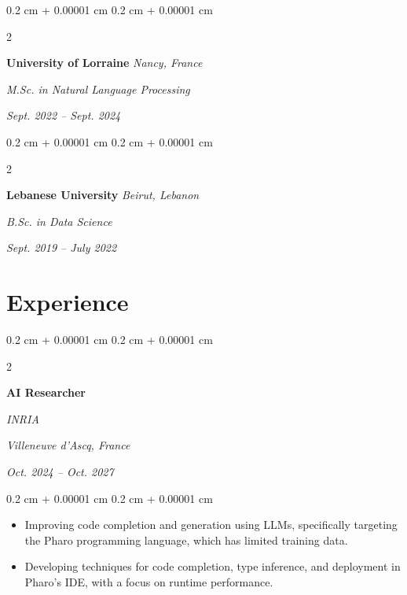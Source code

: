 \documentclass[10pt, letterpaper]{article}
\newenvironment{highlights}{
    \begin{itemize}[
        topsep=0.10 cm,
        parsep=0.10 cm,
        partopsep=0pt,
        itemsep=0pt,
        leftmargin=0.4 cm + 10pt
    ]
}{
    \end{itemize}
} %
\newenvironment{onecolentry}{
    \begin{adjustwidth}{
        0.2 cm + 0.00001 cm
    }{
        0.2 cm + 0.00001 cm
    }
}{
    \end{adjustwidth}
} %
\newenvironment{twocolentry}[2][]{
    \onecolentry
    \def\secondColumn{#2}
    \setcolumnwidth{\fill, 4.5 cm}
    \begin{paracol}{2}
}{
    \switchcolumn \raggedleft \secondColumn
    \end{paracol}
    \endonecolentry
} %
\begin{document}
        \begin{twocolentry}{
            \textit{Sept. 2022 – Sept. 2024}}
            \textbf{University of Lorraine}
            \textit{Nancy, France}

            \textit{M.Sc. in Natural Language Processing}
        \end{twocolentry}
        \vspace{0.10 cm}

        \begin{twocolentry}{
            \textit{Sept. 2019 – July 2022}}
            \textbf{Lebanese University}
            \textit{Beirut, Lebanon}

            \textit{B.Sc. in Data Science}
        \end{twocolentry}

        \vspace{0.10 cm}

    \section{Experience}


        \begin{twocolentry}{
            \textit{Villeneuve d'Ascq, France}    
                
            \textit{Oct. 2024 – Oct. 2027}}
                \textbf{AI Researcher}
                
                \textit{INRIA}
        \end{twocolentry} 

        \vspace{0.10 cm}
        \begin{onecolentry}
            \begin{highlights}
                \item Improving code completion and generation using LLMs, specifically targeting the Pharo programming language, which has limited training data. 
                \item Developing techniques for code completion, type inference, and deployment in Pharo’s IDE, with a focus on runtime performance.
            \end{highlights}
        \end{onecolentry}
        \vspace{0.2 cm}
\end{document}
